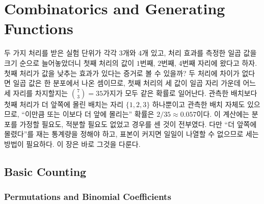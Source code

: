 \chapter{Combinatorics and Generating Functions}
\label{ch:combinatorics}

\providecommand\qbinom[2]{\genfrac{[}{]}{0pt}{}{#1}{#2}_{q}}


두 가지 처리를 받은 실험 단위가 각각 $3$개와 $4$개 있고, 처리 효과를 측정한 일곱 값을 크기 순으로 늘어놓았더니 첫째 처리의 값이 $1$번째, $2$번째, $4$번째 자리에 왔다고 하자. 첫째 처리가 값을 낮추는 효과가 있다는 증거로 볼 수 있을까? 두 처리에 차이가 없다면 일곱 값은 한 분포에서 나온 셈이므로, 첫째 처리의 세 값이 일곱 자리 가운데 어느 세 자리를 차지할지는 $\binom73=35$가지가 모두 같은 확률로 일어난다. 관측한 배치보다 첫째 처리가 더 앞쪽에 몰린 배치는 자리 $\{1,2,3\}$ 하나뿐이고 관측한 배치 자체도 있으므로, ``이만큼 또는 이보다 더 앞에 몰리는'' 확률은 $2/35\approx0.057$이다. 이 계산에는 분포를 가정할 필요도, 적분할 필요도 없었고 경우를 센 것이 전부였다. 다만 ``더 앞쪽에 몰렸다''를 재는 통계량을 정해야 하고, 표본이 커지면 일일이 나열할 수 없으므로 세는 방법이 필요하다. 이 장은 바로 그것을 다룬다.

\section{Basic Counting}
\label{sec:counting}

\subsection{Permutations and Binomial Coefficients}

